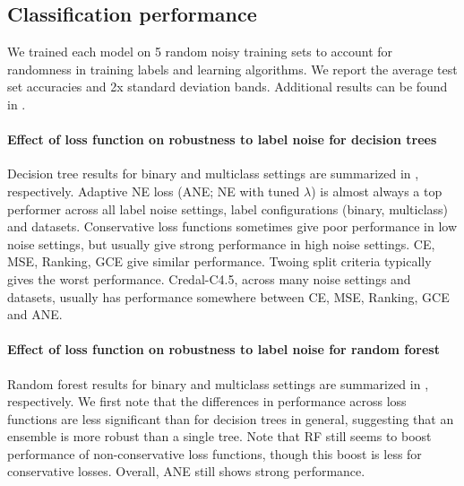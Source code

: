 \documentclass[letterpaper]{article} %
\begin{document}
\subsection{Classification performance}
We trained each model on 5 random noisy training sets to account for randomness in
training labels and learning algorithms.
We report the average test set accuracies and 2x standard deviation bands.
Additional results can be found in .


\paragraph{Effect of loss function on robustness to label noise for decision trees}
Decision tree results for binary and multiclass settings are summarized in
, respectively.
Adaptive NE loss (ANE; NE with tuned $\lambda$) is almost always a top performer
across all label noise settings, label configurations (binary, multiclass) and
datasets.
Conservative loss functions sometimes give poor performance in low noise
settings, but usually give strong performance in high noise settings.
CE, MSE, Ranking, GCE give similar performance.
Twoing split criteria typically gives the worst performance.
Credal-C4.5, across many noise settings and datasets, usually has performance
somewhere between CE, MSE, Ranking, GCE and ANE.

\paragraph{Effect of loss function on robustness to label noise for random forest}
Random forest results for binary and multiclass settings are summarized in
, respectively.
We first note that the
differences in performance across loss functions
are less significant than for
decision trees in general, suggesting that an ensemble is more robust than a
single tree.
Note that RF still seems to boost performance of non-conservative loss functions,
though this boost is less for conservative losses.
Overall, ANE still shows strong performance.
\end{document}
